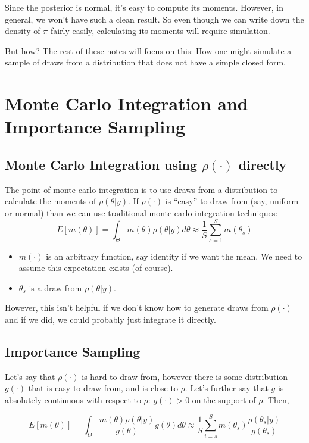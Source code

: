 \documentclass[twoside]{article}
\begin{document}
Since the posterior is normal, it's easy to compute its moments. However, in general, we won't have such a clean result. So even though we can 
write down the density of $\pi$ fairly easily, calculating its moments will require simulation. 

But how? The rest of these notes will focus on this: How one might simulate a sample of draws from a distribution that does not have a simple closed form.

\section{Monte Carlo Integration and Importance Sampling}

\subsection{Monte Carlo Integration using $\rho(\cdot)$ directly}

The point of monte carlo integration is to use draws from a distribution to calculate the moments of $\rho(\theta|y)$. If $\rho(\cdot)$ is ``easy'' to draw from (say, uniform or normal) than we can use traditional monte carlo integration techniques: 
$$E[m(\theta)] = \int_\Theta m(\theta) \rho(\theta|y) d\theta \approx \frac{1}{S} \sum_{s=1}^S m(\theta_s)$$
\begin{itemize}
\item $m(\cdot)$ is an arbitrary function, say identity if we want the mean. We need to assume this expectation exists (of course).  
\item $\theta_s$ is a draw from $\rho(\theta|y)$. 
\end{itemize}

However, this isn't helpful if we don't know how to generate draws from $\rho(\cdot)$ and if we did, we could probably just integrate it directly. 

\subsection{Importance Sampling}

Let's say that $\rho(\cdot)$ is hard to draw from, however there is some distribution $g(\cdot)$ that is easy to draw from, and is close to $\rho$. Let's further say that $g$ is absolutely continuous with respect to $\rho$: $ g(\cdot) > 0 $ on the support of $\rho$. Then, 

$$E[m(\theta)] =  \int_\Theta \frac{ m(\theta) \rho(\theta|y)}{g(\theta)} g(\theta) d\theta \approx \frac{1}{S} \sum_{i=s}^S m(\theta_s) \frac{\rho(\theta_s|y)}{g(\theta_s)}$$
\end{document}
